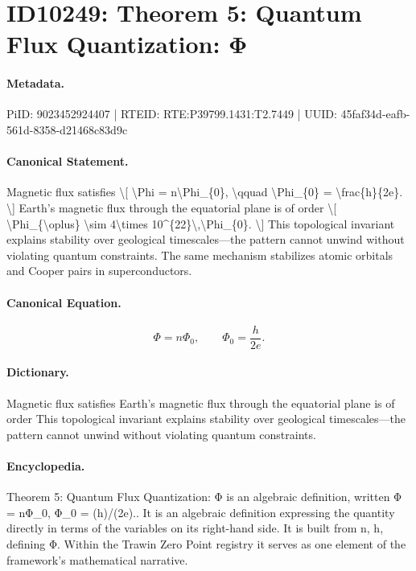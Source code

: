 \section*{ID10249: Theorem 5: Quantum Flux Quantization: Φ}
\paragraph{Metadata.}
PiID: 9023452924407 | RTEID: RTE:P39799.1431:T2.7449 | UUID: 45faf34d-eafb-561d-8358-d21468c83d9c

\paragraph{Canonical Statement.}
Magnetic flux satisfies \textbackslash{}[ \textbackslash{}Phi = n\textbackslash{}Phi\_\{0\}, \textbackslash{}qquad \textbackslash{}Phi\_\{0\} = \textbackslash{}frac\{h\}\{2e\}. \textbackslash{}] Earth's magnetic flux through the equatorial plane is of order \textbackslash{}[ \textbackslash{}Phi\_\{\textbackslash{}oplus\} \textbackslash{}sim 4\textbackslash{}times 10\textasciicircum{}\{22\}\textbackslash{},\textbackslash{}Phi\_\{0\}. \textbackslash{}] This topological invariant explains stability over geological timescales—the pattern cannot unwind without violating quantum constraints. The same mechanism stabilizes atomic orbitals and Cooper pairs in superconductors.

\paragraph{Canonical Equation.}
\[
\Phi = n\Phi_{0}, \qquad \Phi_{0} = \frac{h}{2e}.
\]

\paragraph{Dictionary.}
Magnetic flux satisfies Earth's magnetic flux through the equatorial plane is of order This topological invariant explains stability over geological timescales—the pattern cannot unwind without violating quantum constraints.

\paragraph{Encyclopedia.}
Theorem 5: Quantum Flux Quantization: Φ is an algebraic definition, written Φ = nΦ\_0, Φ\_0 = (h)/(2e).. It is an algebraic definition expressing the quantity directly in terms of the variables on its right-hand side. It is built from n, h, defining Φ. Within the Trawin Zero Point registry it serves as one element of the framework's mathematical narrative.

